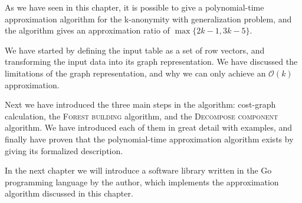 As we have seen in this chapter, it is possible to give a polynomial-time approximation algorithm for the k-anonymity with generalization problem, and the algorithm gives an approximation ratio of \(\max \{ 2k-1, 3k-5 \} \).

We have started by defining the input table as a set of row vectors, and transforming the input data into its graph representation.
We have discussed the limitations of the graph representation, and why we can only achieve an \(\mathcal{O}(k)\) approximation.

Next we have introduced the three main steps in the algorithm: cost-graph calculation, the \textsc{Forest building} algorithm, and the \textsc{Decompose component} algorithm.
We have introduced each of them in great detail with examples, and finally have proven that the polynomial-time approximation algorithm exists by giving its formalized description.

In the next chapter we will introduce a software library written in the Go programming language by the author, which implements the approximation algorithm discussed in this chapter.